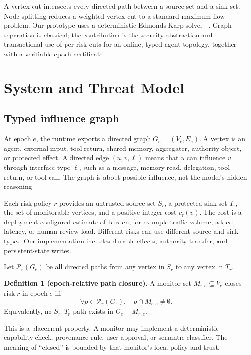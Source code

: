 \documentclass[10pt,journal,compsoc]{IEEEtran}
\newcommand{\paths}{\mathcal{P}}
\begin{document}
A vertex cut intersects every directed path between a source set and a sink
set.  Node splitting reduces a weighted vertex cut to a standard maximum-flow
problem.  Our prototype uses a deterministic Edmonds-Karp solver
~\cite{edmonds1972flow}.  Graph separation is classical; the contribution is
the security abstraction and transactional use of per-risk cuts for an online,
typed agent topology, together with a verifiable epoch certificate.

\section{System and Threat Model}

\subsection{Typed influence graph}

At epoch $e$, the runtime exports a directed graph
$G_e=(V_e,E_e)$.  A vertex is an agent, external input, tool return, shared
memory, aggregator, authority object, or protected effect.  A directed edge
$(u,v,\ell)$ means that $u$ can influence $v$ through interface type $\ell$,
such as a message, memory read, delegation, tool return, or tool call.  The
graph is about possible influence, not the model's hidden reasoning.

Each risk policy $r$ provides an untrusted source set $S_r$, a protected sink
set $T_r$, the set of monitorable vertices, and a positive integer cost
$c_r(v)$.  The cost is a deployment-configured estimate of burden, for example
traffic volume, added latency, or human-review load.  Different risks can use
different source and sink types.  Our implementation includes durable effects,
authority transfer, and persistent-state writes.

Let $\paths_r(G_e)$ be all directed paths from any vertex in $S_r$ to any
vertex in $T_r$.

\textbf{Definition 1 (epoch-relative path closure).}
A monitor set $M_{r,e}\subseteq V_e$ closes risk $r$ in epoch $e$ iff
\begin{equation}
  \forall p\in\paths_r(G_e),\quad p\cap M_{r,e}\neq\emptyset.
  \label{eq:closure}
\end{equation}
Equivalently, no $S_r$--$T_r$ path exists in $G_e-M_{r,e}$.

This is a placement property.  A monitor may implement a deterministic
capability check, provenance rule, user approval, or semantic classifier.  The
meaning of ``closed'' is bounded by that monitor's local policy and trust.
\end{document}
